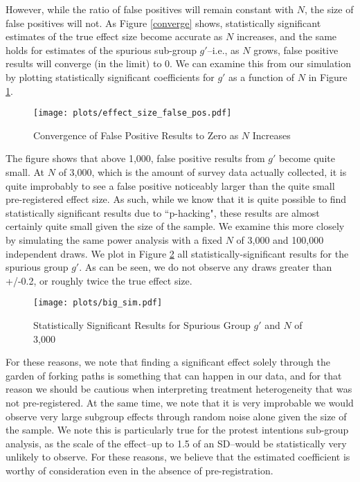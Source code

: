 \documentclass[12pt, letterpaper]{article}
\begin{document}
However, while the ratio of false positives will remain constant with $N$, the size of false positives will not. As Figure \ref{converge} shows, statistically significant estimates of the true effect size become accurate as $N$ increases, and the same holds for estimates of the spurious sub-group $g'$--i.e., as $N$ grows, false positive results will converge (in the limit) to 0. We can examine this from our simulation by plotting statistically significant coefficients for $g'$ as a function of $N$ in Figure \ref{fconverge}.

\begin{figure}
    \caption{Convergence of False Positive Results to Zero as $N$ Increases}
    \centering
    \texttt{[image: plots/effect\_size\_false\_pos.pdf]}
    \label{fconverge}
\end{figure}

The figure shows that above 1,000, false positive results from $g'$ become quite small. At $N$ of 3,000, which is the amount of survey data actually collected, it is quite improbably to see a false positive noticeably larger than the quite small pre-registered effect size. As such, while we know that it is quite possible to find statistically significant results due to ``p-hacking", these results are almost certainly quite small given the size of the sample. We examine this more closely by simulating the same power analysis with a fixed $N$ of 3,000 and 100,000 independent draws. We plot in Figure \ref{100k} all statistically-significant results for the spurious group $g'$. As can be seen, we do not observe any draws greater than +/-0.2, or roughly twice the true effect size.

\begin{figure}
    \centering
    \caption{Statistically Significant Results for Spurious Group $g'$ and $N$ of 3,000}
    \texttt{[image: plots/big\_sim.pdf]}
    \label{100k}
\end{figure}

For these reasons, we note that finding a significant effect solely through the garden of forking paths is something that can happen in our data, and for that reason we should be cautious when interpreting treatment heterogeneity that was not pre-registered. At the same time, we note that it is very improbable we would observe very large subgroup effects through random noise alone given the size of the sample. We note this is particularly true for the protest intentions sub-group analysis, as the scale of the effect--up to 1.5 of an SD--would be statistically very unlikely to observe. For these reasons, we believe that the estimated coefficient is worthy of consideration even in the absence of pre-registration.
\end{document}
